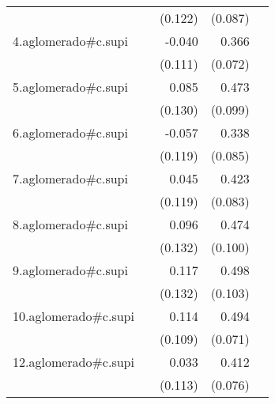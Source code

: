 {\begin{longtable}{l*{4}{D{.}{.}{-1}}}
            &                     &     (0.122)         &     (0.087)         &                     \\
\addlinespace
4.aglomerado#c.supi&                     &      -0.040         &       0.366\sym{***}&                     \\
            &                     &     (0.111)         &     (0.072)         &                     \\
\addlinespace
5.aglomerado#c.supi&                     &       0.085         &       0.473\sym{***}&                     \\
            &                     &     (0.130)         &     (0.099)         &                     \\
\addlinespace
6.aglomerado#c.supi&                     &      -0.057         &       0.338\sym{***}&                     \\
            &                     &     (0.119)         &     (0.085)         &                     \\
\addlinespace
7.aglomerado#c.supi&                     &       0.045         &       0.423\sym{***}&                     \\
            &                     &     (0.119)         &     (0.083)         &                     \\
\addlinespace
8.aglomerado#c.supi&                     &       0.096         &       0.474\sym{***}&                     \\
            &                     &     (0.132)         &     (0.100)         &                     \\
\addlinespace
9.aglomerado#c.supi&                     &       0.117         &       0.498\sym{***}&                     \\
            &                     &     (0.132)         &     (0.103)         &                     \\
\addlinespace
10.aglomerado#c.supi&                     &       0.114         &       0.494\sym{***}&                     \\
            &                     &     (0.109)         &     (0.071)         &                     \\
\addlinespace
12.aglomerado#c.supi&                     &       0.033         &       0.412\sym{***}&                     \\
            &                     &     (0.113)         &     (0.076)         &                     \\

\end{longtable}}
